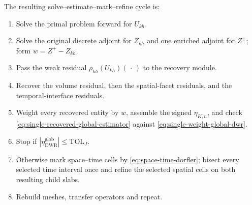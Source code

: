 \documentclass[11pt,a4paper]{article}
\begin{document}
The resulting solve--estimate--mark--refine cycle is:
\begin{enumerate}[leftmargin=*]
 \item Solve the primal problem forward for \(U_{kh}\).
 \item Solve the original discrete adjoint for \(Z_{kh}\) and one enriched adjoint for \(Z^+\); form \(w=Z^+-Z_{kh}\).
 \item Pass the weak residual \(\rho_{kh}(U_{kh})(\,\cdot\,)\) to the recovery module.
 \item Recover the volume residual, then the spatial-facet residuals, and the temporal-interface residuals.
 \item Weight every recovered entity by \(w\), assemble the signed \(\eta_{K,n}\), and check \cref{eq:single-recovered-global-estimator} against \cref{eq:single-weight-global-dwr}.
 \item Stop if \(|\eta_{\mathrm{DWR}}^{\mathrm{glob}}|\le\mathrm{TOL}_J\).
 \item Otherwise mark space--time cells by \cref{eq:space-time-dorfler}; bisect every selected time interval once and refine the selected spatial cells on both resulting child slabs.
 \item Rebuild meshes, transfer operators and repeat.
\end{enumerate}



\newpage


\end{document}
